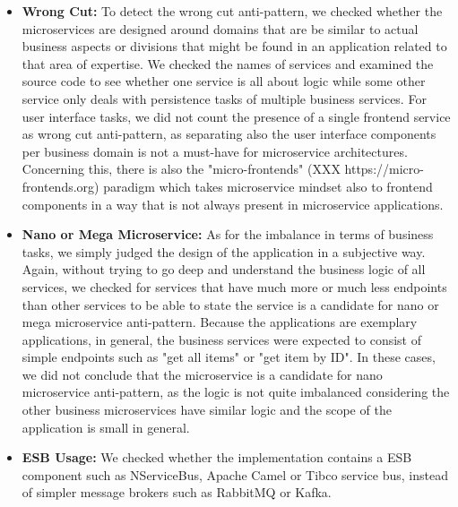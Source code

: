 \documentclass{Configuration_Files/PoliMi3i_thesis}
\begin{document}
\begin{itemize}
\begin{itemize}
        \item \textbf{Wrong Cut:} To detect the wrong cut anti-pattern, we checked whether the microservices are designed around domains that are be similar to actual business aspects or divisions that might be found in an application related to that area of expertise.
        We checked the names of services and examined the source code to see whether one service is all about logic while some other service only deals with persistence tasks of multiple business services.
        For user interface tasks, we did not count the presence of a single frontend service as wrong cut anti-pattern, as separating also the user interface components per business domain is not a must-have for microservice architectures.
        Concerning this, there is also the "micro-frontends" (XXX https://micro-frontends.org) paradigm which takes microservice mindset also to frontend components in a way that is not always present in microservice applications.
        
        \item \textbf{Nano or Mega Microservice:} As for the imbalance in terms of business tasks, we simply judged the design of the application in a subjective way.
        Again, without trying to go deep and understand the business logic of all services, we checked for services that have much more or much less endpoints than other services to be able to state the service is a candidate for nano or mega microservice anti-pattern.
        Because the applications are exemplary applications, in general, the business services were expected to consist of simple endpoints such as "get all items" or "get item by ID".
        In these cases, we did not conclude that the microservice is a candidate for nano microservice anti-pattern, as the logic is not quite imbalanced considering the other business microservices have similar logic and the scope of the application is small in general.
        
        \item \textbf{ESB Usage:} We checked whether the implementation contains a ESB component such as NServiceBus, Apache Camel or Tibco service bus, instead of simpler message brokers such as RabbitMQ or Kafka.
        

\end{itemize}
\end{itemize}
\end{document}
